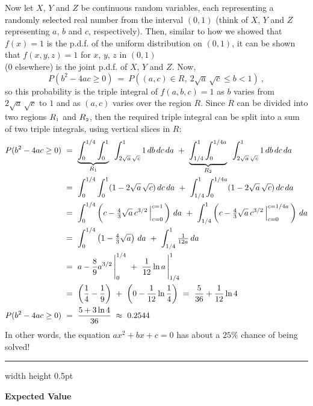 \begin{exmp}
 Now let $X$, $Y$ and $Z$ be continuous random variables, each representing a randomly selected real number from the
 interval $(0,1)$ (think of $X$, $Y$ and $Z$ representing $a$, $b$ and $c$, respectively).
 Then, similar to how we showed that $f(x)=1$ is the p.d.f. of the uniform distribution on $(0,1)$, it can be shown
 that $f(x,y,z)=1$ for $x$, $y$, $z$ in $(0,1)$\\($0$ elsewhere) is the joint p.d.f. of $X$, $Y$ and $Z$.
 Now,
 \begin{displaymath}
  P(b^2 - 4ac \ge 0) ~=~ P((a,c) \in R,~2\sqrt{a}\,\sqrt{c} \le b < 1)~,
 \end{displaymath}
 so this probability is the triple integral of $f(a,b,c) = 1$ as $b$ varies from $2\sqrt{a}\,\sqrt{c}$ to $1$ and as
 $(a,c)$ varies over the region $R$. Since $R$ can be divided into two regions $R_{\scriptscriptstyle 1}$ and $R_{\scriptscriptstyle 2}$, then
 the required triple integral can be split into a sum of two triple integrals, using vertical slices in $R$:
 \begin{align*}
  P(b^2 - 4ac \ge 0) ~&=~
  \underbrace{\int_0^{1/4} \int_0^1}_{R_{\scriptscriptstyle 1}}\,\,\, \int_{2\sqrt{a}\,\sqrt{c}}^1 1\,db\,dc\,da ~+~
  \underbrace{\int_{1/4}^1 \int_0^{1/4a}}_{R_{\scriptscriptstyle 2}}\,\,\, \int_{2\sqrt{a}\,\sqrt{c}}^1 1\,db\,dc\,da\\
  &=~ \int_0^{1/4} \int_0^1 (1-2\sqrt{a}\,\sqrt{c})\,dc\,da ~+~
   \int_{1/4}^1 \int_0^{1/4a} (1-2\sqrt{a}\,\sqrt{c})\,dc\,da\\
  &=~ \int_0^{1/4} \left( c - \tfrac{4}{3}\sqrt{a}\,c^{3/2} \,\Big|_{c=0}^{c=1} \,\right)\,da ~+~
   \int_{1/4}^1 \left( c - \tfrac{4}{3}\sqrt{a}\,c^{3/2} \,\Big|_{c=0}^{c=1/4a} \,\right)\,da\\
  &=~ \int_0^{1/4} \left( 1 - \tfrac{4}{3}\sqrt{a} \right)\,da ~+~
   \int_{1/4}^1 \tfrac{1}{12a}\,da\\
  &=~ a - \frac{8}{9}a^{3/2}\,\Bigg|_0^{1/4} ~+~ \frac{1}{12}\ln a \,\Bigg|_{1/4}^1\\
  &=~ \left( \frac{1}{4} - \frac{1}{9} \right) ~+~ \left( 0 - \frac{1}{12}\ln \frac{1}{4} \right) ~=~
  \frac{5}{36} + \frac{1}{12}\ln 4\\
  P(b^2 - 4ac \ge 0) ~&=~ \frac{5+3\ln 4}{36} ~\approx~ 0.2544
 \end{align*}
 In other words, the equation $ax^2 + bx + c = 0$ has about a $25$\% chance of being solved!
\end{exmp}
\hrule width \textwidth height 0.5pt
\medskip

\par\noindent\textbf{\large{Expected Value}}\normalsize\smallskip

